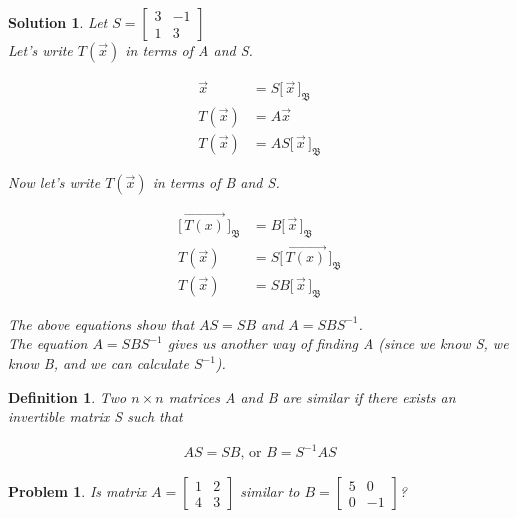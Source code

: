 \documentclass{article}
\newtheorem{definition}{Definition}
\newtheorem{problem}{Problem}
\newtheorem*{solution}{Solution}
\newcommand{\Coord}[2]{\Bigg[ \, \vec{#1} \, \Bigg]_{\mathfrak{#2}}}
\begin{document}
\begin{solution}
Let $S = \begin{bmatrix} 3 & -1 \\ 1 & 3 \end{bmatrix}$ \\

Let's write $T(\vec{x})$ in terms of A and S.

\begin{align*}
\vec{x} &= S \Coord{x}{B} \\
T(\vec{x}) &= A \vec{x} \\
T(\vec{x}) &= A S \Coord{x}{B} 
\end{align*}

Now let's write $T(\vec{x})$ in terms of B and S.

\begin{align*}
\Coord{T(x)}{B} &= B\Coord{x}{B} \\
T(\vec{x}) &= S \Coord{T(x)}{B}  \\
T(\vec{x}) &= S B\Coord{x}{B}
\end{align*}

The above equations show that $AS = SB$ and $A = SBS^{-1}$. \\

The equation $A = SBS^{-1}$ gives us another way of finding A (since we know S, we know B, and we can calculate $S^{-1}$).

\end{solution}

\begin{definition}
Two $n \times n$ matrices A and B are similar if there exists an invertible matrix S such that

\begin{align*}
AS = SB\textrm{, or }B = S^{-1}AS
\end{align*}

\end{definition}

\begin{problem}
Is matrix $A = \begin{bmatrix}1 & 2 \\ 4 & 3 \end{bmatrix}$ similar to $B = \begin{bmatrix}5 & 0 \\ 0 & -1 \end{bmatrix}$?
\end{problem}
\end{document}
